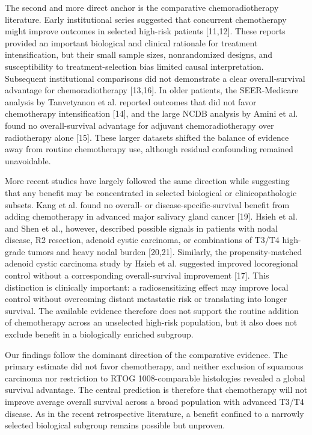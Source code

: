\documentclass[10pt,twocolumn]{article}
\begin{document}
The second and more direct anchor is the comparative chemoradiotherapy literature. Early institutional series suggested that concurrent chemotherapy might improve outcomes in selected high-risk patients [11,12]. These reports provided an important biological and clinical rationale for treatment intensification, but their small sample sizes, nonrandomized designs, and susceptibility to treatment-selection bias limited causal interpretation. Subsequent institutional comparisons did not demonstrate a clear overall-survival advantage for chemoradiotherapy [13,16]. In older patients, the SEER-Medicare analysis by Tanvetyanon et al. reported outcomes that did not favor chemotherapy intensification [14], and the large NCDB analysis by Amini et al. found no overall-survival advantage for adjuvant chemoradiotherapy over radiotherapy alone [15]. These larger datasets shifted the balance of evidence away from routine chemotherapy use, although residual confounding remained unavoidable.\par
More recent studies have largely followed the same direction while suggesting that any benefit may be concentrated in selected biological or clinicopathologic subsets. Kang et al. found no overall- or disease-specific-survival benefit from adding chemotherapy in advanced major salivary gland cancer [19]. Hsieh et al. and Shen et al., however, described possible signals in patients with nodal disease, R2 resection, adenoid cystic carcinoma, or combinations of T3/T4 high-grade tumors and heavy nodal burden [20,21]. Similarly, the propensity-matched adenoid cystic carcinoma study by Hsieh et al. suggested improved locoregional control without a corresponding overall-survival improvement [17]. This distinction is clinically important: a radiosensitizing effect may improve local control without overcoming distant metastatic risk or translating into longer survival. The available evidence therefore does not support the routine addition of chemotherapy across an unselected high-risk population, but it also does not exclude benefit in a biologically enriched subgroup.\par
Our findings follow the dominant direction of the comparative evidence. The primary estimate did not favor chemotherapy, and neither exclusion of squamous carcinoma nor restriction to RTOG 1008-comparable histologies revealed a global survival advantage. The central prediction is therefore that chemotherapy will not improve average overall survival across a broad population with advanced T3/T4 disease. As in the recent retrospective literature, a benefit confined to a narrowly selected biological subgroup remains possible but unproven.\par
\end{document}
